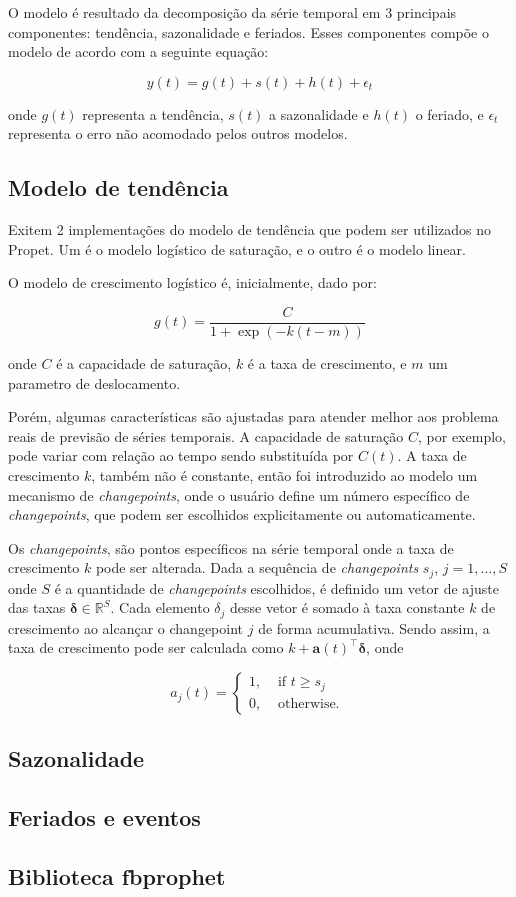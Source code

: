 O modelo é resultado da decomposição da série temporal em 3 principais componentes: tendência, sazonalidade e feriados. Esses componentes compõe o modelo de acordo com a seguinte equação:

\[y(t) = g(t) + s(t) + h(t) + \epsilon_{t}\]

onde $g(t)$ representa a tendência, $s(t)$ a sazonalidade e $h(t)$ o feriado, e $\epsilon_{t}$ representa o erro não acomodado pelos outros modelos.

\subsection{Modelo de tendência}
Exitem 2 implementações do modelo de tendência que podem ser utilizados no Propet. Um é o modelo logístico de saturação, e o outro é o modelo linear.

O modelo de crescimento logístico é, inicialmente, dado por:

\[g(t)=\frac{C}{1+\exp (-k(t-m))}\]

onde $C$ é a capacidade de saturação, $k$ é a taxa de crescimento, e $m$ um parametro de deslocamento.

Porém, algumas características são ajustadas para atender melhor aos problema reais de previsão de séries temporais. A capacidade de saturação $C$, por exemplo, pode variar com relação ao tempo sendo substituída por $C(t)$. A taxa de crescimento $k$, também não é constante, então foi introduzido ao modelo um mecanismo de \textit{changepoints}, onde o usuário define um número específico de \textit{changepoints}, que podem ser escolhidos explicitamente ou automaticamente.

Os \textit{changepoints}, são pontos específicos na série temporal onde a taxa de crescimento $k$ pode ser alterada. Dada a sequência de \textit{changepoints} $s_{j}$, $j=1, \ldots, S$ onde $S$ é a quantidade de \textit{changepoints} escolhidos, é definido um vetor de ajuste das taxas $\boldsymbol{\delta} \in \mathbb{R}^{S}$. Cada elemento $\delta_{j}$ desse vetor é somado à taxa constante $k$ de crescimento ao alcançar o changepoint $j$ de forma acumulativa. Sendo assim, a taxa de crescimento pode ser calculada como $k+\mathbf{a}(t)^{\top} \boldsymbol{\delta}$, onde

\begin{equation}
    a_{j}(t)= \begin{cases}1, & \text { if } t \geq s_{j} \\ 0, & \text { otherwise. }\end{cases}
    \end{equation}

\subsection{Sazonalidade}
\subsection{Feriados e eventos}
\subsection{Biblioteca fbprophet}
